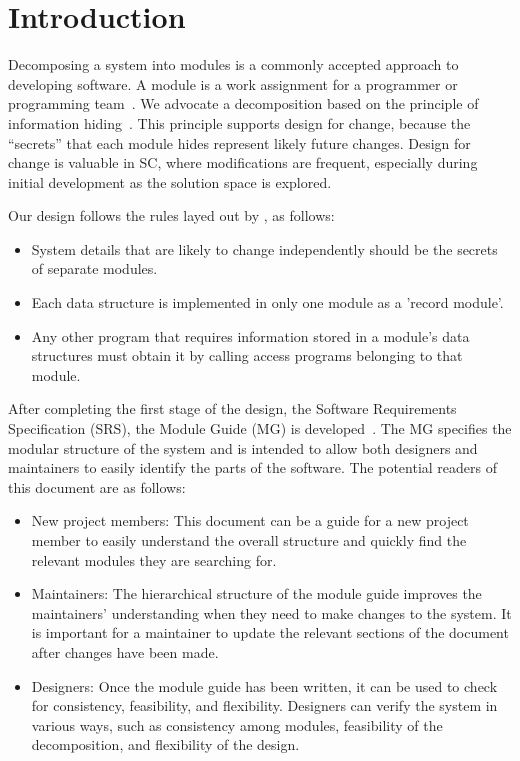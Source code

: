 \documentclass[12pt, titlepage]{article}
\begin{document}
\newpage

\tableofcontents

\listoftables

\listoffigures

\newpage


\section{Introduction}

Decomposing a system into modules is a commonly accepted approach to developing
software.  A module is a work assignment for a programmer or programming
team~\citep{ParnasEtAl1984}.  We advocate a decomposition
based on the principle of information hiding~\citep{Parnas1972a}.  This
principle supports design for change, because the ``secrets'' that each module
hides represent likely future changes.  Design for change is valuable in SC,
where modifications are frequent, especially during initial development as the
solution space is explored.  

Our design follows the rules layed out by \citet{ParnasEtAl1984}, as follows:
\begin{itemize}
\item System details that are likely to change independently should be the
  secrets of separate modules.
\item Each data structure is implemented in only one module as a 'record module'.
\item Any other program that requires information stored in a module's data
  structures must obtain it by calling access programs belonging to that module.
\end{itemize}

After completing the first stage of the design, the Software Requirements
Specification (SRS), the Module Guide (MG) is developed~\citep{ParnasEtAl1984}. The MG
specifies the modular structure of the system and is intended to allow both
designers and maintainers to easily identify the parts of the software.  The
potential readers of this document are as follows:

\begin{itemize}
\item New project members: This document can be a guide for a new project member
  to easily understand the overall structure and quickly find the
  relevant modules they are searching for.
\item Maintainers: The hierarchical structure of the module guide improves the
  maintainers' understanding when they need to make changes to the system. It is
  important for a maintainer to update the relevant sections of the document
  after changes have been made.
\item Designers: Once the module guide has been written, it can be used to
  check for consistency, feasibility, and flexibility. Designers can verify the
  system in various ways, such as consistency among modules, feasibility of the
  decomposition, and flexibility of the design.
\end{itemize}
\end{document}
